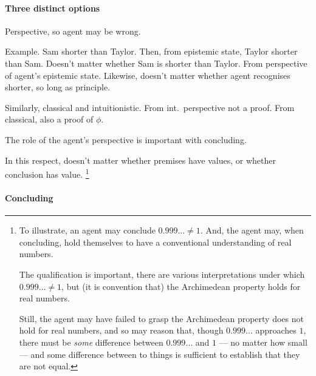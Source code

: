 \paragraph{Three distinct options}

\begin{note}
  Perspective, so agent may be wrong.

  Example.
  Sam shorter than Taylor.
  Then, from epistemic state, Taylor shorter than Sam.
  Doesn't matter whether Sam is shorter than Taylor.
  From perspective of agent's epistemic state.
  Likewise, doesn't matter whether agent recognises shorter, so long as principle.

  Similarly, classical and intuitionistic.
  From int.\ perspective not a proof.
  From classical, also a proof of \(\phi\).
\end{note}

\begin{note}
  The role of the agent's perspective is important with concluding.

  In this respect, doesn't matter whether premises have values, or whether conclusion has value.%
  \footnote{
    To illustrate, an agent may conclude \(0.999\dots \ne 1\).
    And, the agent may, when concluding, hold themselves to have a conventional understanding of real numbers.

    The qualification is important, there are various interpretations under which \(0.999\dots \ne 1\), but (it is convention that) the Archimedean property holds for real numbers.

    Still, the agent may have failed to grasp the Archimedean property does not hold for real numbers, and so may reason that, though \(0.999\dots\) approaches \(1\), there must be \emph{some} difference between \(0.999\dots\) and \(1\) --- no matter how small --- and some difference between to things is sufficient to establish that they are not equal.
  }
\end{note}

\paragraph{Concluding}

